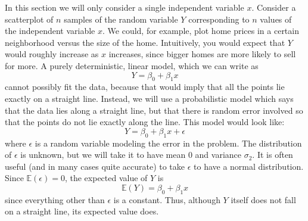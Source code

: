 \documentclass[12pt]{article}
\theoremstyle{definition}
\theoremstyle{remark}
\def\E{{\mathbb E}}
\begin{document}
In this section we will only consider a single independent variable $x$. Consider a scatterplot of $n$ samples of the random variable $Y$ corresponding to $n$ values of the independent variable $x$. We could, for example, plot home prices in a certain neighborhood versus the size of the home. Intuitively, you would expect that $Y$ would roughly increase as $x$ increases, since bigger homes are more likely to sell for more. A purely deterministic, linear model, which we can write as
\[
Y = \beta_0 + \beta_1 x
\]
cannot possibly fit the data, because that would imply that all the points lie exactly on a straight line. Instead, we will use a probabilistic model which says that the data lies along a straight line, but that there is random error involved so that the points do not lie exactly along the line. This model would look like:
\[
Y = \beta_0 + \beta_1 x + \epsilon
\]
where $\epsilon$ is a random variable modeling the error in the problem. The distribution of $\epsilon$ is unknown, but we will take it to have mean 0 and variance $\sigma_2$. It is often useful (and in many cases quite accurate) to take $\epsilon$ to have a normal distribution. Since $\E(\epsilon) = 0$, the expected value of $Y$ is
\[
\E(Y) = \beta_0 + \beta_1 x
\]
since everything other than $\epsilon$ is a constant. Thus, although $Y$ itself does not fall on a straight line, its expected value does. \\
\end{document}
